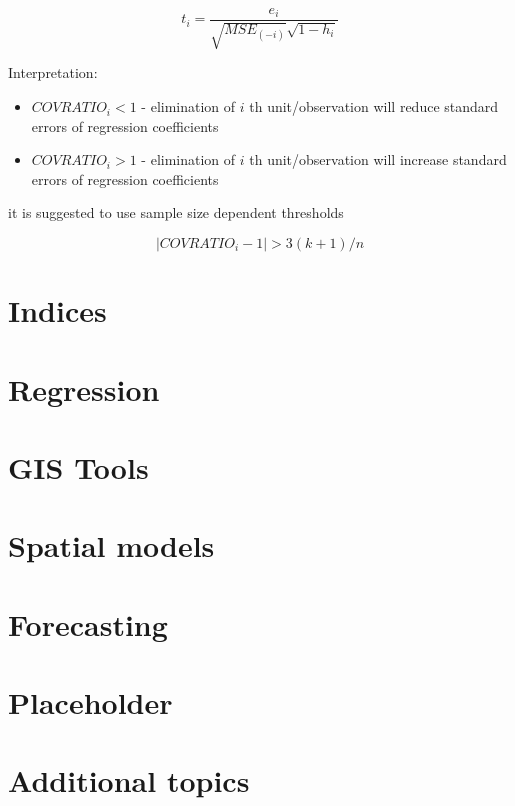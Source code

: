 \documentclass[]{book}
\providecommand{\tightlist}{%
  \setlength{\itemsep}{0pt}\setlength{\parskip}{0pt}}
\begin{document}
\[
t_i=\frac{e_i}{\sqrt{MSE_{(-i)}}\sqrt{{1-h_i}}}
\]

Interpretation:

\begin{itemize}
\tightlist
\item
  \(COVRATIO_i < 1\) - elimination of \(i\) th unit/observation will
  reduce standard errors of regression coefficients
\item
  \(COVRATIO_i > 1\) - elimination of \(i\) th unit/observation will
  increase standard errors of regression coefficients
\end{itemize}

it is suggested to use sample size dependent thresholds

\[
|COVRATIO_i-1| > 3(k+1)/n
\]

\chapter{Indices}\label{indices}

\chapter{Regression}\label{regression}

\chapter{GIS Tools}\label{gis-tools}

\chapter{Spatial models}\label{spatial-models}

\chapter{Forecasting}\label{forecasting}

\chapter{Placeholder}\label{placeholder}

\chapter{Additional topics}\label{additional-topics}


\end{document}
